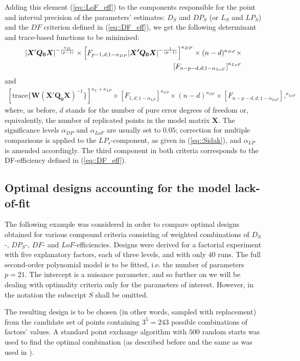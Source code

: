 Adding this element (\ref{eq::LoF_eff}) to the components responsible for the point and interval precision of the parameters' estimates: $D_S$ and $DP_S$ (or $L_S$ and $LP_S$) and the $DF$ criterion defined in (\ref{eq::DF_eff}), we get the following determinant and trace-based functions to be minimised:
\begin{align}
\label{eq::ExtraFD_crit}
\vert\bm{X}'\bm{Q_{0}}\bm{X}\vert^{-\frac{\kappa_D}{(p-1)}}\times \left[F_{p-1,d;1-\alpha_{DP}}\vert\bm{X'}\bm{Q_{0}}\bm{X}\vert^{-\frac{1}{(p-1)}}\right]^{\kappa_{DP}}\times(n-d)^{\kappa_{DF}}\times \notag \\ \left[F_{n-p-d,d;1-\alpha_{LoF}}\right]^{\kappa_{LoF}}
\end{align}
and
\begin{align}
\label{eq::ExtraFL_crit}
\left[\mbox{trace}\{\bm{W}(\bm{X'}\bm{Q_{0}}\bm{X})^{-1}\}\right]^{\kappa_L+\kappa_{LP}}\times\left[F_{1,d;1-\alpha_{LP}}\right]^{\kappa_{LP}}\times (n-d)^{\kappa_{DF}}\times\left[F_{n-p-d,d;1-\alpha_{LoF}}\right],^{\kappa_{LoF}}
\end{align}
where, as before, $d$ stands for the number of pure error degrees of freedom or, equivalently, the number of replicated points in the model matrix $\bm{X}$. The significance levels $\alpha_{DP}$ and $\alpha_{LoF}$ are usually set to $0.05$; correction for multiple comparisons is applied to the $LP_s$-component, as given in (\ref{eq::Sidak}), and $\alpha_{LP}$ is amended accordingly. The third component in both criteria corresponds to the DF-efficiency defined in (\ref{eq::DF_eff}).
 
\subsection{Optimal designs accounting for the model lack-of-fit}
\label{sec::optimal_extraF}
The following example was considered in order to compare optimal designs obtained for various compound criteria consisting of weighted combinations of $D_S$-, $DP_S$-, $DF$- and $LoF$-efficiencies. 
Designs were derived for a factorial experiment with five explanatory factors, each of three levels, and with only $40$ runs. The full second-order polynomial model is to be fitted, i.e. the number of parameters $p=21.$ The intercept is a nuisance parameter, and so further on we will be dealing with optimality criteria only for the parameters of interest. However, in the notation the subscript $S$ shall be omitted.

The resulting design is to be chosen (in other words, sampled with replacement) from the candidate set of points containing $3^{5}=243$ possible combinations of factors' values. A standard point exchange algorithm with $500$ random starts was used to find the optimal combination (as described before and the same as was used in \citealp{GilmourTrinca2012}).


